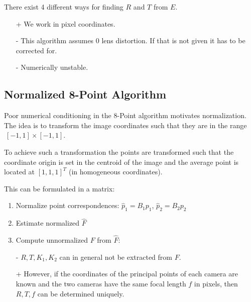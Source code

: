 \documentclass[10pt,a4paper]{scrartcl}
\begin{document}
\begin{multicols*}{2}

There exist 4 different ways for finding $R$ and $T$ from $E$.

\begin{itemize}
\item [+] We work in pixel coordinates.
\item [-] This algorithm assumes 0 lens distortion. If that is not given it has to be corrected for.
\item [-] Numerically unstable.
\end{itemize}

\subsection{Normalized 8-Point Algorithm}

Poor numerical conditioning in the 8-Point algorithm motivates normalization. The idea is to transform the image coordinates such that they are in the range $~[-1,1]\times[-1,1]$.


To achieve such a transformation the points are transformed such that the coordinate origin is set in the centroid of the image and the average point is located at $[1,1,1]^T$ (in homogeneous coordinates).


This can be formulated in a matrix:


\begin{enumerate}
\item Normalize point correspondences: $\hat{p}_1 = B_1p_1$, $\hat{p}_2 = B_2 p_2$
\item Estimate normalized $\hat{F}$
\item Compute unnormalized $F$ from $\hat{F}$: 
\end{enumerate}

\begin{itemize}
\item[-] $R,T,K_1,K_2$ can in general not be extracted from $F$.
\item[+] However, if the coordinates of the principal points of each camera are known and the two cameras have the same focal length $f$ in pixels, then $R,T,f$ can be determined uniquely.
\end{itemize}


\end{multicols*}
\end{document}
